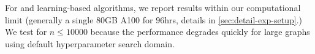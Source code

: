 For \isco and learning-based algorithms, we report results within our computational limit (generally a single 80GB A100 for $96$hrs, details in \cref{sec:detail-exp-setup}.) We test \pcqo for $n\leq 10000$ because the performance degrades quickly for large graphs using default hyperparameter search domain.
